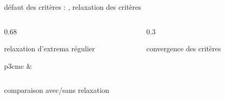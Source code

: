 \begin{frame}{défaut des critères : , relaxation des critères}

\begin{columns}
\begin{column}{0.68 \textwidth}
\begin{block}{relaxation d'extrema régulier}
\begin{tabular}{p{3cm}c}
&
\raisebox{-25mm}{\usebox{\detectextrema}}
\end{tabular}   
\end{block}
\end{column}

\begin{column}{0.3\textwidth}
\begin{block}{convergence des critères}
\end{block}

\end{column}
\end{columns}

\begin{block}{comparaison avec/sans relaxation}
\end{block}

\hspace{2cm}
\hspace{2cm}


\end{frame}


